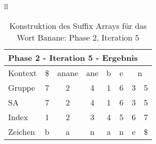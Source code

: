 \begin{table}[H]
\begin{adjustbox}{max width=\textwidth}
\begin{tabular}{ll}
\begin{tabular}{lccccccc}
\multicolumn{8}{l}{Phase 2 - Iteration 5 - Ergebnis}                                                                                                                                            \\ \hline
\multicolumn{1}{l|}{Kontext} & \multicolumn{1}{c|}{\$} & \multicolumn{1}{c|}{anane} & \multicolumn{1}{c|}{ane} & \multicolumn{1}{c|}{b} & \multicolumn{1}{c|}{e} & \multicolumn{2}{c}{n}        \\
\multicolumn{1}{l|}{Gruppe}  & \multicolumn{1}{c|}{7}  & \multicolumn{1}{c|}{2}     & \multicolumn{1}{c|}{4}   & \multicolumn{1}{c|}{1} & \multicolumn{1}{c|}{6} & 3 & 5                         \\ 
\multicolumn{1}{l|}{SA}      & \multicolumn{1}{c|}{7}  & \multicolumn{1}{c|}{2}     & \multicolumn{1}{c|}{4}   & \multicolumn{1}{c|}{1} & \multicolumn{1}{c|}{6} & 3 & \cellcolor[HTML]{\yellow}5 \\ \hline
\multicolumn{1}{l|}{Index}   & 1                       & 2                          & 3                        & 4                      & 5                      & 6 & 7                         \\
\multicolumn{1}{l|}{Zeichen} & b                       & a                          & n                        & a                      & n                      & e & \$                       
\end{tabular}

\end{tabular}
\end{adjustbox}

\caption[Konstruktion des Suffix Arrays für das Wort Banane: Phase 2, Iteration 5]{Konstruktion des Suffix Arrays für das Wort Banane: Phase 2, Iteration 5}
\label{fig_banane_2_5} 
\end{table}
